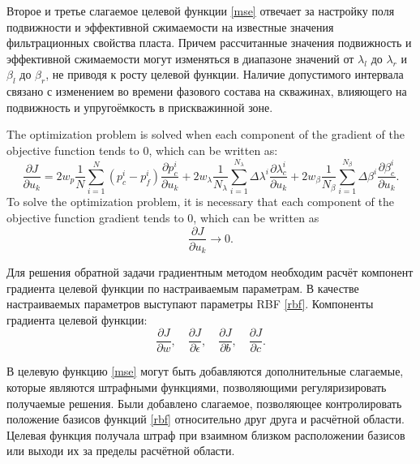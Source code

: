\documentclass{article}
\begin{document}
Второе и третье слагаемое целевой функции {\ref{mse}} отвечает за настройку поля подвижности и эффективной сжимаемости  на известные значения фильтрационных свойства пласта. Причем рассчитанные значения подвижность и эффективной сжимаемости могут изменяться в диапазоне значений от $\lambda_l$ до $\lambda_r$ и $\beta_l$ до $\beta_r$, не приводя к росту целевой функции. Наличие допустимого интервала связано с изменением во времени фазового состава на скважинах, влияющего на подвижность и упругоёмкость в прискважинной зоне. 


The optimization problem is solved when each component of the gradient of the objective function tends to 0, which can be written as:
\begin{equation}\label{grad}
	\frac{\partial J}{\partial u_k} = 
	2w_p\frac{1}{N}\sum_{i=1}^N	({p_c^i-p_f^i}) \frac{\partial p_c^i}{\partial u_k}+
	2w_{\lambda}\frac{1}{N_\lambda}\sum_{i=1}^{N_\lambda}{\Delta\lambda^i}\frac{\partial
		\lambda_{c}^i}{\partial u_k}+
	2w_{\beta}\frac{1}{N_\beta}\sum_{i=1}^{N_\beta}{\Delta\beta^i}\frac{\partial
			\beta_{c}^i}{\partial u_k}.
\end{equation}
To solve the optimization problem, it is necessary that each
component  of the objective function gradient tends to 0, which can
be written as
\begin{equation} \label{rp}
	\frac{\partial J}{\partial u_k} \rightarrow 0.
\end{equation}

Для решения обратной задачи градиентным методом необходим расчёт компонент градиента целевой функции по настраиваемым параметрам. В качестве настраиваемых параметров выступают параметры RBF \ref{rbf}. Компоненты градиента целевой функции:
\begin{equation*}
		\frac{\partial J}{\partial w},\quad \frac{\partial J}{\partial \epsilon},\quad \frac{\partial J}{\partial b}, \quad \frac{\partial J}{\partial c}.
\end{equation*}

В целевую функцию \ref{mse} могут быть добавляются дополнительные слагаемые, которые являются штрафными функциями, позволяющими регуляризировать получаемые решения. Были добавлено слагаемое, позволяющее контролировать положение базисов функций \ref{rbf} относительно друг друга и расчётной области. Целевая функция получала штраф при взаимном близком расположении базисов или выходи их за пределы расчётной области.
\end{document}
